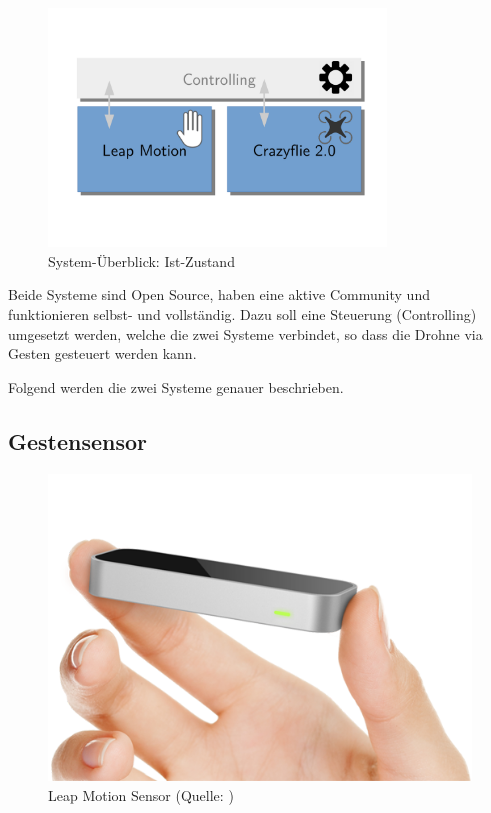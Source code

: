 \begin{figure}[H]
	\centering
	\includegraphics[width=0.8\textwidth]{figures/system_is.pdf}
	\caption{System-Überblick: Ist-Zustand}
	\vspace{-3\baselineskip}
\end{figure}

Beide Systeme sind Open Source, haben eine aktive Community und funktionieren selbst- und vollständig.
Dazu soll eine Steuerung (Controlling) umgesetzt werden, welche die zwei Systeme verbindet, so dass die Drohne via Gesten gesteuert werden kann.

Folgend werden die zwei Systeme genauer beschrieben.

\newpage
\subsection{Gestensensor}
\label{subsec:leapmotion}
\begin{figure}
	\includegraphics[width=1.0\linewidth]{images/analysis/leap_simple.png}
	\caption[Leap Motion Sensor]{Leap Motion Sensor (Quelle: )}
\end{figure}

